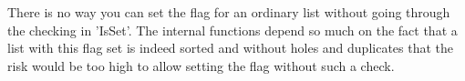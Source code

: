There is no way you can set the flag for an ordinary  list  without going
through the checking in 'IsSet'.  The  internal  functions depend so much
on the fact that a list with  this flag set  is indeed sorted and without
holes and duplicates that the risk would be too high to allow setting the
flag without such a check.




